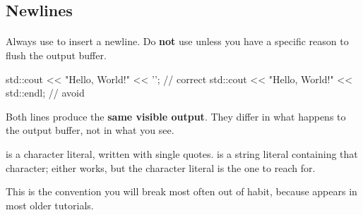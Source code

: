 \documentclass[
    10pt,
    dvipsnames,
    svgnames,
    x11names,
    aspectratio=1610,
    english,
    codeminted]{beamer}
\begin{document}
\subsection*{Newlines}
\begingroup
\divframetrue
\renewcommand{\divbartextA}{\secname}
\renewcommand{\divbartextB}{}
\begin{frame}{\secname}
  \divbar{\secname}{\subsecname}
  \framesubtitle{\subsecname}

Always use  to insert a newline. Do \textbf{not} use  unless you have a specific reason to flush the output buffer.

\begin{cppcodebasic}[][fontsize=\small]
std::cout << "Hello, World!" << '\n';       // correct
std::cout << "Hello, World!" << std::endl;  // avoid
\end{cppcodebasic}

\begin{compactitem}
\small
    \item Both lines produce the \textbf{same visible output}. They differ in what happens to the output buffer, not in what you see.
    \item {} is a character literal, written with single quotes.  is a string literal containing that character; either works, but the character literal is the one to reach for.
\end{compactitem}

\medskip
\begin{MyBox}
This is the convention you will break most often out of habit, because  appears in most older tutorials.
\end{MyBox}
\end{frame}
\endgroup
\end{document}
